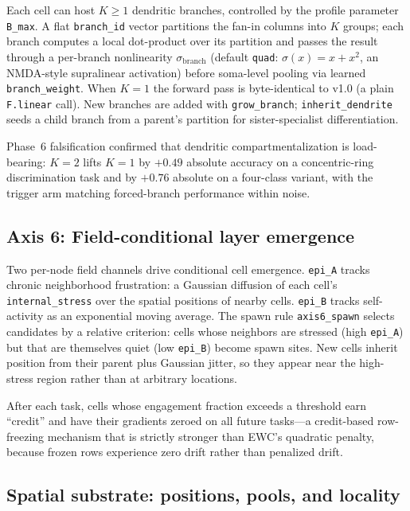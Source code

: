 \documentclass[11pt]{article}
\begin{document}
Each cell can host $K \geq 1$ dendritic branches, controlled by the profile parameter \texttt{B\_max}.
A flat \texttt{branch\_id} vector partitions the fan-in columns into $K$ groups; each branch computes a local dot-product over its partition and passes the result through a per-branch nonlinearity $\sigma_{\mathrm{branch}}$ (default \texttt{quad}: $\sigma(x) = x + x^2$, an NMDA-style supralinear activation) before soma-level pooling via learned \texttt{branch\_weight}.
When $K=1$ the forward pass is byte-identical to v1.0 (a plain \texttt{F.linear} call).
New branches are added with \texttt{grow\_branch}; \texttt{inherit\_dendrite} seeds a child branch from a parent's partition for sister-specialist differentiation.

Phase~6 falsification confirmed that dendritic compartmentalization is load-bearing: $K{=}2$ lifts $K{=}1$ by $+0.49$ absolute accuracy on a concentric-ring discrimination task and by $+0.76$ absolute on a four-class variant, with the trigger arm matching forced-branch performance within noise.

\subsection{Axis 6: Field-conditional layer emergence}
\label{sec:axis6}

Two per-node field channels drive conditional cell emergence.
\texttt{epi\_A} tracks chronic neighborhood frustration: a Gaussian diffusion of each cell's \texttt{internal\_stress} over the spatial positions of nearby cells.
\texttt{epi\_B} tracks self-activity as an exponential moving average.
The spawn rule \texttt{axis6\_spawn} selects candidates by a relative criterion: cells whose neighbors are stressed (high \texttt{epi\_A}) but that are themselves quiet (low \texttt{epi\_B}) become spawn sites.
New cells inherit position from their parent plus Gaussian jitter, so they appear near the high-stress region rather than at arbitrary locations.

After each task, cells whose engagement fraction exceeds a threshold earn ``credit'' and have their gradients zeroed on all future tasks---a credit-based row-freezing mechanism that is strictly stronger than EWC's quadratic penalty, because frozen rows experience zero drift rather than penalized drift.

\subsection{Spatial substrate: positions, pools, and locality}
\label{sec:spatial}
\end{document}
